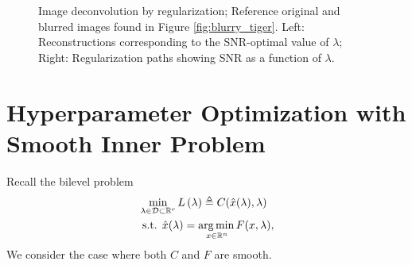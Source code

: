 \documentclass[11pt, twoside]{report}
\begin{document}
\begin{figure}[htp]


    \caption{Image deconvolution by regularization; Reference original and blurred images found in Figure \ref{fig:blurry_tiger}. Left: Reconstructions corresponding to the SNR-optimal value of $\lambda$;  Right: Regularization paths showing SNR as a function of $\lambda$.}\label{fig:deblurry_tiger}
\end{figure}

\section{Hyperparameter Optimization with Smooth Inner Problem}
\label{section-hoag}
Recall the bilevel problem
\begin{align*} 
&\min _{\lambda \in \mathcal{D} \subset \mathbb{R}^r} L\left(\lambda \right) \triangleq C(\hat{x}(\lambda), \lambda)\\
&\text { s.t. } \hat{x}(\lambda) =\underset{x \in \mathbb{R}^{n}} {\operatorname*{arg\, min \,}} {F(x, \lambda)},
\end{align*}
We consider the case where both $C$ and $F$ are smooth. 
\end{document}
